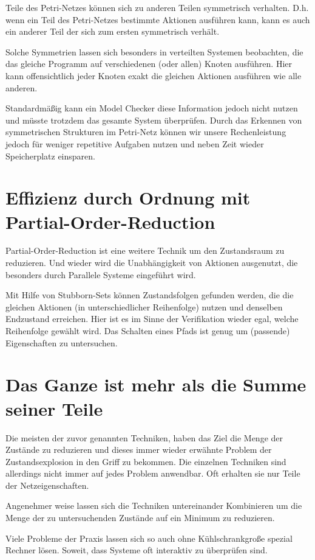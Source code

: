 Teile des Petri-Netzes können sich zu anderen Teilen symmetrisch verhalten. 
D.h. wenn ein Teil des Petri-Netzes bestimmte Aktionen ausführen kann, kann es auch ein anderer Teil der sich zum ersten symmetrisch verhält.

Solche Symmetrien lassen sich besonders in verteilten Systemen beobachten, die das gleiche Programm auf verschiedenen (oder allen) Knoten ausführen.
Hier kann offensichtlich jeder Knoten exakt die gleichen Aktionen ausführen wie alle anderen.

Standardmäßig kann ein Model Checker diese Information jedoch nicht nutzen und müsste trotzdem das gesamte System überprüfen.
Durch das Erkennen von symmetrischen Strukturen im Petri-Netz können wir unsere Rechenleistung jedoch für weniger repetitive Aufgaben nutzen und neben Zeit wieder Speicherplatz einsparen.

\section{Effizienz durch Ordnung mit Partial-Order-Reduction}
Partial-Order-Reduction ist eine weitere Technik um den Zustandsraum zu reduzieren. 
Und wieder wird die Unabhängigkeit von Aktionen ausgenutzt, die besonders durch Parallele Systeme eingeführt wird.

Mit Hilfe von Stubborn-Sets können Zustandsfolgen gefunden werden, die die gleichen Aktionen (in unterschiedlicher Reihenfolge) nutzen und denselben Endzustand erreichen.
Hier ist es im Sinne der Verifikation wieder egal, welche Reihenfolge gewählt wird.
Das Schalten eines Pfads ist genug um (passende) Eigenschaften zu untersuchen.

\section{Das Ganze ist mehr als die Summe seiner Teile}
Die meisten der zuvor genannten Techniken, haben das Ziel die Menge der Zustände zu reduzieren und dieses immer wieder erwähnte Problem der Zustandsexplosion in den Griff zu bekommen.
Die einzelnen Techniken sind allerdings nicht immer auf jedes Problem anwendbar. Oft erhalten sie nur Teile der Netzeigenschaften.

Angenehmer weise lassen sich die Techniken untereinander Kombinieren um die Menge der zu untersuchenden Zustände auf ein Minimum zu reduzieren.

Viele Probleme der Praxis lassen sich so auch ohne Kühlschrankgroße spezial Rechner lösen.
Soweit, dass Systeme oft interaktiv zu überprüfen sind.